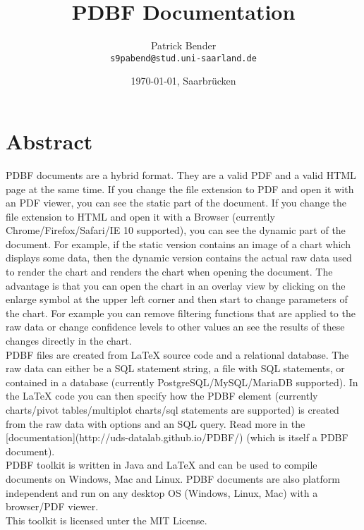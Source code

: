 \documentclass[11pt]{scrartcl}
\title{PDBF Documentation}
\author{
 Patrick Bender\\
  \texttt{s9pabend@stud.uni-saarland.de}
}
\date{\today{}, Saarbrücken}
\begin{document}
\maketitle

\section{Abstract}
PDBF documents are a hybrid format. They are a valid PDF and a valid HTML page at the same time. 
If you change the file extension to PDF and open it with an PDF viewer, you can see the static part of the document. If you change the file extension to HTML and open it with a Browser (currently Chrome/Firefox/Safari/IE 10 supported), you can see the dynamic part of the document. For example, if the static version contains an image of a chart which displays some data, then the dynamic version contains the actual raw data used to render the chart and renders the chart when opening the document. The advantage is that you can open the chart in an overlay view by clicking on the enlarge symbol at the upper left corner and then start to change parameters of the chart. For example you can remove filtering functions that are applied to the raw data or change confidence levels to other values an see the results of these changes directly in the chart. \\

\noindent PDBF files are created from LaTeX source code and a relational database. The raw data can either be a SQL statement string, a file with SQL statements, or contained in a database (currently PostgreSQL/MySQL/MariaDB supported). In the LaTeX code you can then specify how the PDBF element (currently charts/pivot tables/multiplot charts/sql statements are supported) is created from the raw data with options and an SQL query. Read more in the [documentation](http://uds-datalab.github.io/PDBF/) (which is itself a PDBF document).\\

\noindent PDBF toolkit is written in Java and LaTeX and can be used to compile documents on Windows, Mac and Linux. PDBF documents are also platform independent and run on any desktop OS (Windows, Linux, Mac) with a browser/PDF viewer.\\

\noindent This toolkit is licensed unter the MIT License.\\
\end{document}

